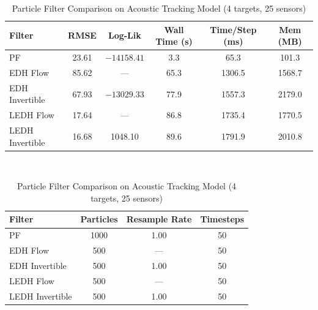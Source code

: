 \documentclass{article}
\begin{document}
\begin{table}[H]
\centering
\caption{Particle Filter Comparison on Acoustic Tracking Model (4 targets, 25 sensors)}
\begin{tabular}{lccccc}
\toprule
\textbf{Filter} & \textbf{RMSE} & \textbf{Log-Lik} & \textbf{Wall Time (s)} & \textbf{Time/Step (ms)} & \textbf{Mem (MB)} \\
\midrule
PF                & 23.61  & $-14158.41$ & 3.3    & 65.3    & 101.3  \\
EDH Flow          & 85.62  & ---         & 65.3   & 1306.5  & 1568.7 \\
EDH Invertible    & 67.93  & $-13029.33$ & 77.9   & 1557.3  & 2179.0 \\
LEDH Flow         & 17.64  & ---         & 86.8   & 1735.4  & 1770.5 \\
LEDH Invertible   & 16.68  & 1048.10     & 89.6   & 1791.9  & 2010.8 \\
\bottomrule
\end{tabular}
\\[1em]
\begin{tabular}{lccc}
\toprule
\textbf{Filter} & \textbf{Particles} & \textbf{Resample Rate} & \textbf{Timesteps} \\
\midrule
PF                & 1000 & 1.00 & 50 \\
EDH Flow          & 500  & ---  & 50 \\
EDH Invertible    & 500  & 1.00 & 50 \\
LEDH Flow         & 500  & ---  & 50 \\
LEDH Invertible   & 500  & 1.00 & 50 \\
\bottomrule
\end{tabular}
\label{tab:acoustic_tracking_comparison}
\end{table}
\end{document}
